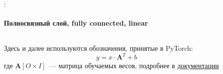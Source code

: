 \documentclass{beamer}
\newcommand{\mtx}[1]{\boldsymbol{#1}}
\begin{document}
\begin{frame}{\secname : \subsecname}
  \framesubtitle{Полносвязный слой, fully connected, linear}
  \begin{columns}

    \begin{column}{0.5\textwidth}
      Здесь и далее используются обозначения, принятые в PyTorch:
      $$
      y = x \cdot \mtx{A}^T + b
      $$
      где $\mtx{A}[O \times I]$~--- матрица обучаемых весов,
      подробнее в
      \href{https://docs.pytorch.org/docs/stable/generated/torch.nn.Linear.html}{документации}

    \end{column}

    \begin{column}{0.5\textwidth}
      \begin{center}
      \end{center}
    \end{column}

  \end{columns}
\end{frame}
\end{document}
